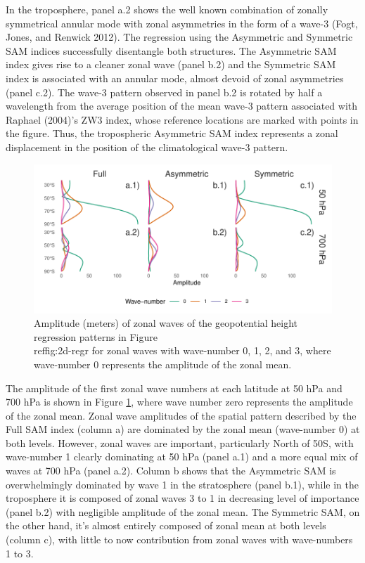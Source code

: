 \documentclass[smallextended]{svjour3}       %
\begin{document}
In the troposphere, panel a.2 shows the well known combination of zonally symmetrical annular mode with zonal asymmetries in the form of a wave-3 (Fogt, Jones, and Renwick 2012). The regression using the Asymmetric and Symmetric SAM indices successfully disentangle both structures. The Asymmetric SAM index gives rise to a cleaner zonal wave (panel b.2) and the Symmetric SAM index is associated with an annular mode, almost devoid of zonal asymmetries (panel c.2). The wave-3 pattern observed in panel b.2 is rotated by half a wavelength from the average position of the mean wave-3 pattern associated with Raphael (2004)'s ZW3 index, whose reference locations are marked with points in the figure. Thus, the tropospheric Asymmetric SAM index represents a zonal displacement in the position of the climatological wave-3 pattern.

\begin{figure}
\includegraphics{wave-amplitude-1} \caption{Amplitude (meters) of zonal waves of the geopotential height regression patterns in Figure \\ref{fig:2d-regr} for zonal waves with wave-number 0, 1, 2, and 3, where wave-number 0 represents the amplitude of the zonal mean.}\label{fig:wave-amplitude}
\end{figure}

The amplitude of the first zonal wave numbers at each latitude at 50 hPa and 700 hPa is shown in Figure \ref{fig:wave-amplitude}, where wave number zero represents the amplitude of the zonal mean. Zonal wave amplitudes of the spatial pattern described by the Full SAM index (column a) are dominated by the zonal mean (wave-number 0) at both levels. However, zonal waves are important, particularly North of 50\degree S, with wave-number 1 clearly dominating at 50 hPa (panel a.1) and a more equal mix of waves at 700 hPa (panel a.2). Column b shows that the Asymmetric SAM is overwhelmingly dominated by wave 1 in the stratosphere (panel b.1), while in the troposphere it is composed of zonal waves 3 to 1 in decreasing level of importance (panel b.2) with negligible amplitude of the zonal mean. The Symmetric SAM, on the other hand, it's almost entirely composed of zonal mean at both levels (column c), with little to now contribution from zonal waves with wave-numbers 1 to 3.
\end{document}
